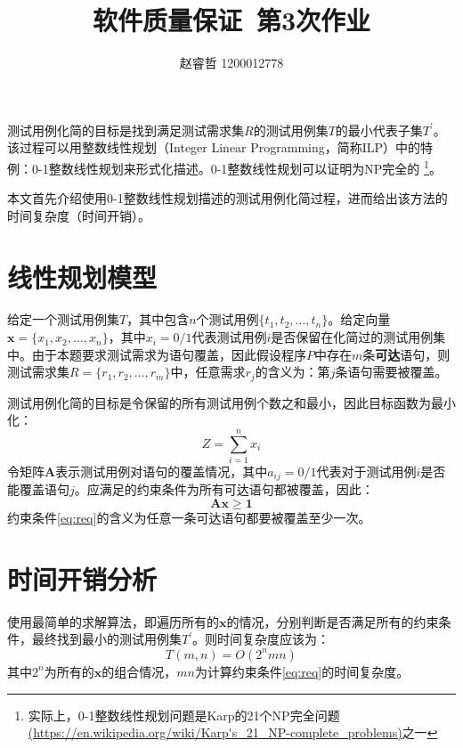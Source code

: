 \documentclass[a4paper]{article}
\begin{document}
\title{软件质量保证\ 第3次作业}
\author{赵睿哲 1200012778}
\maketitle

测试用例化简的目标是找到满足测试需求集$R$的测试用例集$T$的最小代表子集$T^{'}$。该过程可以用整数线性规划（Integer Linear Programming，简称ILP）中的特例：0-1整数线性规划来形式化描述。0-1整数线性规划可以证明为NP完全的
\footnote{实际上，0-1整数线性规划问题是Karp的21个NP完全问题\url{(https://en.wikipedia.org/wiki/Karp's_21_NP-complete_problems)}之一}。

本文首先介绍使用0-1整数线性规划描述的测试用例化简过程，进而给出该方法的时间复杂度（时间开销）。

\section{线性规划模型}

给定一个测试用例集$T$，其中包含$n$个测试用例$\{ t_1, t_2, \dots, t_n \}$。给定向量$\mathbf{x} = \{ x_1, x_2, \dots, x_n \}$，其中$x_i = 0/1$代表测试用例$i$是否保留在化简过的测试用例集中。由于本题要求测试需求为语句覆盖，因此假设程序$P$中存在$m$条\textbf{可达}语句，则测试需求集$R = \{r_1,r_2,\dots,r_m\}$中，任意需求$r_j$的含义为：第$j$条语句需要被覆盖。

测试用例化简的目标是令保留的所有测试用例个数之和最小，因此目标函数为最小化：
\begin{equation}\label{eq:objec}
Z = \sum_{i=1}^{n} x_i
\end{equation}
令矩阵$\mathbf{A}$表示测试用例对语句的覆盖情况，其中$a_{ij} = 0/1$代表对于测试用例$i$是否能覆盖语句$j$。应满足的约束条件为所有可达语句都被覆盖，因此：
\begin{equation}\label{eq:req}
\mathbf{A}\mathbf{x} \geq \mathbf{1}
\end{equation}
约束条件\ref{eq:req}的含义为任意一条可达语句都要被覆盖至少一次。

\section{时间开销分析}

使用最简单的求解算法，即遍历所有的$\mathbf{x}$的情况，分别判断是否满足所有的约束条件，最终找到最小的测试用例集$T^{'}$。则时间复杂度应该为：
\begin{equation}
T(m, n) = O(2^nmn)
\end{equation}
其中$2^n$为所有的$\mathbf{x}$的组合情况，$mn$为计算约束条件\ref{eq:req}的时间复杂度。
\end{document}
